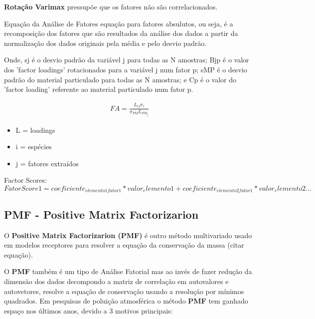 \textbf{Rotação Varimax} pressupõe que os fatores não são correlacionados.

Equação da Análise de Fatores
equação para fatores absulutos, ou seja, é a recomposição dos fatores que 
são resultados da análise dos dados a partir da normalização dos dados 
originais pela média e pelo desvio padrão.

\citep{keiding1986}

Onde, sj é o desvio padrão da variável j para todas as N amostras; Bjp é o valor dos 'factor loadings' rotacionados para a variável j num fator p; sMP é o desvio padrão do material particulado para todas as N amostras; e Cp é o valor do 'factor loading' referente ao material particulado num fator p.

\begin{eqnarray}
FA = \frac{L_{ij}\sigma_i}{\sigma_{PM}L_{PM_j}}
\end{eqnarray}

\begin{itemize}
  \item L = loadings
  \item i = espécies
  \item j = fatores extraídos
\end{itemize}

Factor Scores: 
\begin{equation}
FatorScore1 = coeficiente_{elemento1 fator1}*valor_elemento1 + coeficiente_{elemento2 fator1}*valor_elemento2 ...
\end{equation} 

\subsection{\textbf{PMF} - Positive Matrix Factorizarion}

O \textbf{Positive Matrix Factorizarion (PMF)} é outro método multivariado usado
em modelos receptores para resolver a equação da conservação da massa 
(citar equação).



O \textbf{PMF} também é um tipo de Análise Fatorial
mas ao invés de fazer redução da dimensão dos dados decompondo a matriz de 
correlação em autovalores e autovetores, resolve a equação de conservação 
usando a resolução por mínimos quadrados. Em pesquisas de poluição atmosférica 
o método \textbf{PMF} tem ganhado espaço nos últimos anos, devido a 3 motivos 
principais:

